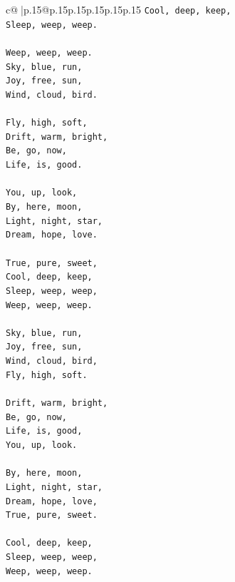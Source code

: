 \documentclass{article}
\begin{document}
{\begin{supertabular}{c@{$\;$}|p{.15\linewidth}@{}p{.15\linewidth}p{.15\linewidth}p{.15\linewidth}p{.15\linewidth}p{.15\linewidth}}
{{{\texttt{Cool, deep, keep,} \\
\texttt{Sleep, weep, weep.} \\
\\ 
\texttt{Weep, weep, weep.} \\
\texttt{Sky, blue, run,} \\
\texttt{Joy, free, sun,} \\
\texttt{Wind, cloud, bird.} \\
\\ 
\texttt{Fly, high, soft,} \\
\texttt{Drift, warm, bright,} \\
\texttt{Be, go, now,} \\
\texttt{Life, is, good.} \\
\\ 
\texttt{You, up, look,} \\
\texttt{By, here, moon,} \\
\texttt{Light, night, star,} \\
\texttt{Dream, hope, love.} \\
\\ 
\texttt{True, pure, sweet,} \\
\texttt{Cool, deep, keep,} \\
\texttt{Sleep, weep, weep,} \\
\texttt{Weep, weep, weep.} \\
\\ 
\texttt{Sky, blue, run,} \\
\texttt{Joy, free, sun,} \\
\texttt{Wind, cloud, bird,} \\
\texttt{Fly, high, soft.} \\
\\ 
\texttt{Drift, warm, bright,} \\
\texttt{Be, go, now,} \\
\texttt{Life, is, good,} \\
\texttt{You, up, look.} \\
\\ 
\texttt{By, here, moon,} \\
\texttt{Light, night, star,} \\
\texttt{Dream, hope, love,} \\
\texttt{True, pure, sweet.} \\
\\ 
\texttt{Cool, deep, keep,} \\
\texttt{Sleep, weep, weep,} \\
\texttt{Weep, weep, weep.} \\
}}}
\end{supertabular}}
\end{document}

